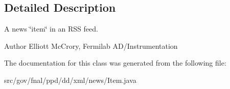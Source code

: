 \subsection{Detailed Description}
A news \char`\"{}item\char`\"{} in an R\-S\-S feed.

\begin{DoxyAuthor}{Author}
Elliott Mc\-Crory, Fermilab A\-D/\-Instrumentation 
\end{DoxyAuthor}


The documentation for this class was generated from the following file\-:\begin{DoxyCompactItemize}
\item 
src/gov/fnal/ppd/dd/xml/news/Item.\-java\end{DoxyCompactItemize}
